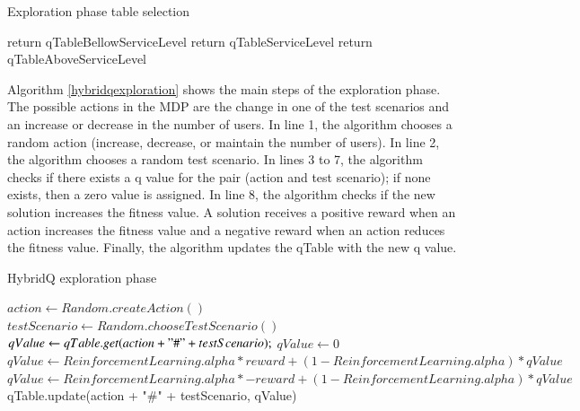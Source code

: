 \documentclass{bmcart}
\begin{document}
\begin{algorithm}[h]
  \caption{Exploration phase table selection }\label{hybridqexploration}
  \begin{algorithmic}[1]    
    \State return qTableBellowServiceLevel       
    \EndIf
    \State return qTableServiceLevel  
    \EndIf
    \State return qTableAboveServiceLevel  
    \EndIf
  \end{algorithmic}
\end{algorithm}

Algorithm \ref{hybridqexploration} shows the main steps of the exploration phase. The possible actions in the MDP are the change in one of the test scenarios and an increase or decrease in the number of users. In line 1, the algorithm chooses a random action (increase, decrease, or maintain the number of users). In line 2, the algorithm chooses a random test scenario. In lines 3 to 7, the algorithm checks if there exists a q value  for the pair (action and test scenario); if none exists, then a zero value is assigned. In line 8, the algorithm checks if the new solution increases the fitness value. A solution receives a positive reward when an action increases the fitness value and a negative reward when an action reduces the fitness value.  Finally, the algorithm updates the qTable with the new q value.


\begin{algorithm}[h]
  \caption{HybridQ exploration phase }\label{hybridqexploration}
  \begin{algorithmic}[1]    
    \State $action \gets Random.createAction()$
    \State $testScenario \gets Random.chooseTestScenario()$
    \State $ qValue \gets qTable.get(action + "\#" + testScenario);$
    \Else
        \State $ qValue \gets 0$
    \EndIf
     \State $qValue \gets ReinforcementLearning.alpha * reward + (1 - ReinforcementLearning.alpha) * qValue$     
     \Else
          \State $qValue \gets ReinforcementLearning.alpha * -reward + (1 - ReinforcementLearning.alpha) * qValue$     
    \EndIf     
    \State qTable.update(action + "\#" + testScenario, qValue)    
  \end{algorithmic}
\end{algorithm}
\end{document}
